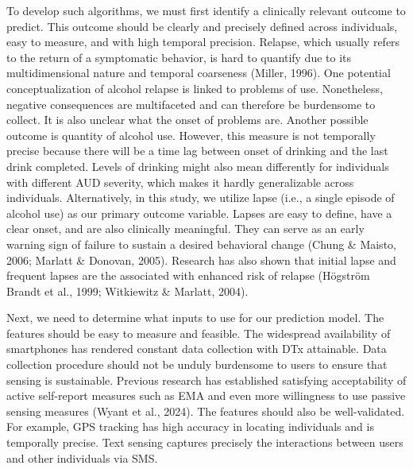 \documentclass[
  letterpaper,
  DIV=11,
  numbers=noendperiod]{scrartcl}
\begin{document}
To develop such algorithms, we must first identify a clinically relevant
outcome to predict. This outcome should be clearly and precisely defined
across individuals, easy to measure, and with high temporal precision.
Relapse, which usually refers to the return of a symptomatic behavior,
is hard to quantify due to its multidimensional nature and temporal
coarseness (Miller, 1996). One potential conceptualization of alcohol
relapse is linked to problems of use. Nonetheless, negative consequences
are multifaceted and can therefore be burdensome to collect. It is also
unclear what the onset of problems are. Another possible outcome is
quantity of alcohol use. However, this measure is not temporally precise
because there will be a time lag between onset of drinking and the last
drink completed. Levels of drinking might also mean differently for
individuals with different AUD severity, which makes it hardly
generalizable across individuals. Alternatively, in this study, we
utilize lapse (i.e., a single episode of alcohol use) as our primary
outcome variable. Lapses are easy to define, have a clear onset, and are
also clinically meaningful. They can serve as an early warning sign of
failure to sustain a desired behavioral change (Chung \& Maisto, 2006;
Marlatt \& Donovan, 2005). Research has also shown that initial lapse
and frequent lapses are the associated with enhanced risk of relapse
(Högström Brandt et al., 1999; Witkiewitz \& Marlatt, 2004).

Next, we need to determine what inputs to use for our prediction model.
The features should be easy to measure and feasible. The widespread
availability of smartphones has rendered constant data collection with
DTx attainable. Data collection procedure should not be unduly
burdensome to users to ensure that sensing is sustainable. Previous
research has established satisfying acceptability of active self-report
measures such as EMA and even more willingness to use passive sensing
measures (Wyant et al., 2024). The features should also be
well-validated. For example, GPS tracking has high accuracy in locating
individuals and is temporally precise. Text sensing captures precisely
the interactions between users and other individuals via SMS.
\end{document}
